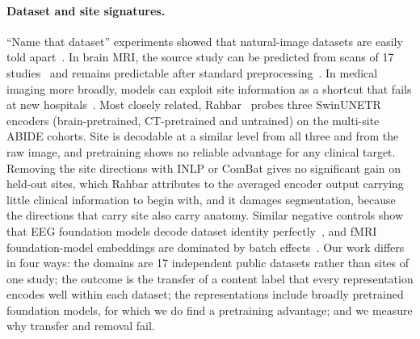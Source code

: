 \documentclass[11pt]{article}
\begin{document}
\paragraph{Dataset and site signatures.}
``Name that dataset'' experiments showed that natural-image datasets are
easily told apart~\cite{torralba_unbiased_2011}. In brain MRI, the source
study can be predicted from scans of 17 studies~\cite{wachinger_detect_2021}
and remains predictable after standard
preprocessing~\cite{glocker_machine_2019}. In medical imaging more broadly,
models can exploit site information as a shortcut that fails at new
hospitals~\cite{zech_variable_2018, geirhos_shortcut_2020}. Most closely
related, Rahbar~\cite{rahbar_frozen_2026} probes three SwinUNETR encoders
(brain-pretrained, CT-pretrained and untrained) on the multi-site ABIDE
cohorts. Site is decodable at a similar level from all three and from the raw
image, and pretraining shows no reliable advantage for any clinical target.
Removing the site directions with INLP or ComBat gives no significant gain on
held-out sites, which Rahbar attributes to the averaged encoder output carrying little
clinical information to begin with, and it damages segmentation, because the
directions that carry site also carry anatomy. Similar negative controls show that EEG foundation
models decode dataset identity perfectly~\cite{zare_negative-control_2026},
and fMRI foundation-model embeddings are dominated by batch
effects~\cite{tao_batch_2026}. Our work differs in four ways: the domains are
17 independent public datasets rather than sites of one study; the outcome is
the transfer of a content label that every representation encodes well within
each dataset; the representations include broadly pretrained foundation
models, for which we do find a pretraining advantage; and we measure why
transfer and removal fail.
\end{document}
